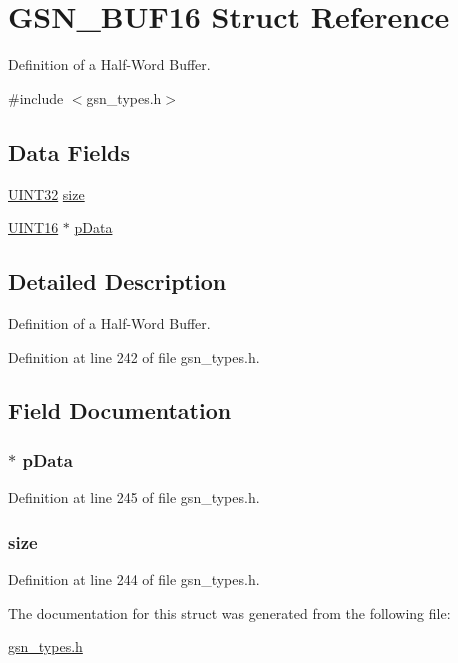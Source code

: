 \hypertarget{a00029}{
\section{GSN\_\-BUF16 Struct Reference}
\label{a00029}
}


Definition of a Half-\/Word Buffer.  




{\ttfamily \#include $<$gsn\_\-types.h$>$}

\subsection*{Data Fields}
\begin{DoxyCompactItemize}
\item 
\hyperlink{a00660_gae1e6edbbc26d6fbc71a90190d0266018}{UINT32} \hyperlink{a00029_a6d4bac4be8d2f0ee400eb63ac2204aac}{size}
\item 
\hyperlink{a00660_ga09f1a1fb2293e33483cc8d44aefb1eb1}{UINT16} $\ast$ \hyperlink{a00029_a815011907b70911e2b0b5e3baef51b45}{pData}
\end{DoxyCompactItemize}


\subsection{Detailed Description}
Definition of a Half-\/Word Buffer. 

Definition at line 242 of file gsn\_\-types.h.



\subsection{Field Documentation}
\hypertarget{a00029_a815011907b70911e2b0b5e3baef51b45}{
\subsubsection[{pData}]{$\ast$ {\bf pData}}}
\label{a00029_a815011907b70911e2b0b5e3baef51b45}


Definition at line 245 of file gsn\_\-types.h.

\hypertarget{a00029_a6d4bac4be8d2f0ee400eb63ac2204aac}{
\subsubsection[{size}]{ {\bf size}}}
\label{a00029_a6d4bac4be8d2f0ee400eb63ac2204aac}


Definition at line 244 of file gsn\_\-types.h.



The documentation for this struct was generated from the following file:\begin{DoxyCompactItemize}
\item 
\hyperlink{a00599}{gsn\_\-types.h}\end{DoxyCompactItemize}
